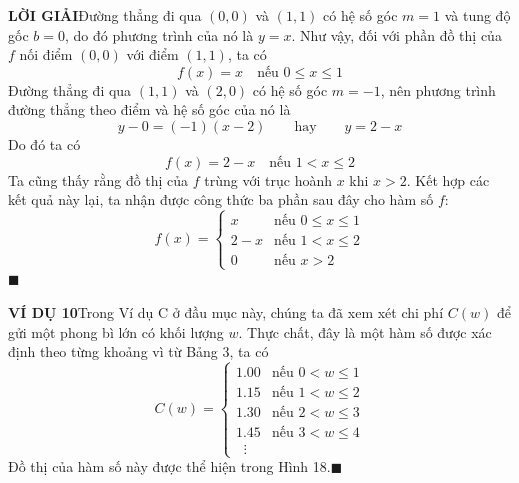 \begin{minipage}[t]{0.708\textwidth}
    \vspace{3pt}
    \noindent
    \textbf{\textsf{\color{stewartcyan}LỜI GIẢI}}\quad Đường thẳng đi qua $(0, 0)$ và $(1, 1)$ có hệ số góc $m = 1$ và tung độ gốc $b = 0$, do đó phương trình của nó là $y = x$. Như vậy, đối với phần đồ thị của $f$ nối điểm $(0, 0)$ với điểm $(1, 1)$, ta có
    \[
    f(x) = x \quad \text{nếu } 0 \leqslant x \leqslant 1
    \]
    Đường thẳng đi qua $(1, 1)$ và $(2, 0)$ có hệ số góc $m = -1$, nên phương trình đường thẳng theo điểm và hệ số góc của nó là
    \[
    y - 0 = (-1)(x - 2) \qquad\text{hay}\qquad y = 2 - x
    \]
    Do đó ta có
    \[
    f(x) = 2 - x \quad \text{nếu } 1 < x \leqslant 2
    \]
    Ta cũng thấy rằng đồ thị của $f$ trùng với trục hoành $x$ khi $x > 2$. Kết hợp các kết quả này lại, ta nhận được công thức ba phần sau đây cho hàm số $f$:
    \[
    f(x) = \begin{cases}
    x & \text{nếu } 0 \leqslant x \leqslant 1 \\
    2 - x & \text{nếu } 1 < x \leqslant 2 \\
    0 & \text{nếu } x > 2
    \end{cases}
    \]\hfill{\color{stewartcyan}$\blacksquare$}

    \vspace{3pt}
    \noindent
    \textbf{\textsf{\color{stewartcyan}VÍ DỤ 10}}\quad Trong Ví dụ C ở đầu mục này, chúng ta đã xem xét chi phí $C(w)$ để gửi một phong bì lớn có khối lượng $w$. Thực chất, đây là một hàm số được xác định theo từng khoảng vì từ Bảng 3, ta có
    \[
    C(w) = \begin{cases}
    1.00 & \text{nếu } 0 < w \leqslant 1 \\
    1.15 & \text{nếu } 1 < w \leqslant 2 \\
    1.30 & \text{nếu } 2 < w \leqslant 3 \\
    1.45 & \text{nếu } 3 < w \leqslant 4 \\
    \;\;\vdots
    \end{cases}
    \]
    Đồ thị của hàm số này được thể hiện trong Hình 18.\hfill{\color{stewartcyan}$\blacksquare$}
\end{minipage}